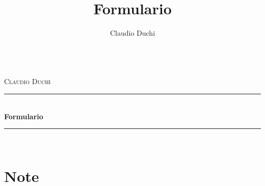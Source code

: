 \documentclass[openany]{book}%
\title{Formulario}
\author{Claudio Duchi}
\date{\datetime}
\makeatletter
\newcommand{\HRule}{\rule{\linewidth}{0.5mm}}
\renewcommand\frontmatter{%
	\cleardoublepage
	\@mainmatterfalse
}
\renewcommand\mainmatter{%
	\cleardoublepage
	\@mainmattertrue
}
\makeatother
\begin{document}
		\frontmatter
		\hypersetup{pageanchor=false}
		\begin{titlepage}
			\begin{center}
			\\[1cm]
				\textsc{\LARGE Claudio Duchi}\\[1.5cm]
				\HRule \\[0.4cm]
				{ \huge \bfseries Formulario}\\[0.4cm]
				\HRule \\[1.5cm]
				\vfill
			\end{center}
		\end{titlepage}
	\hypersetup{pageanchor=true}
		
		\tableofcontents
		\listoffigures
			\listoftables
			\mainmatter
			
\part{Note}

\printindex
\end{document}
